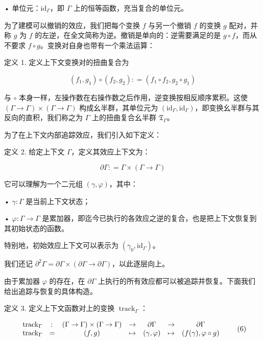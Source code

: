 \documentclass[
  10
]{article}
\begin{document}
• 单位元：\({ \mathrm { i d } } _ { \Gamma }\)，即 $\Gamma$ 上的恒等函数，充当复合的单位元。

为了建模可以撤销的效应，我们把每个变换 \(f\) 与另一个撤销 \(f\) 的变换 \(g\) 配对，并称 \(g\) 为 \(f\) 的左逆，在全文简称为逆。撤销是单向的：逆需要满足的是 \(g \circ f\)，而从不要求 \(f \circ g\)。变换对自身也带有一个乘法运算：

定义 1. 定义上下文变换对的扭曲复合为

\[
( f _ { 1 } , g _ { 1 } ) \circ ( f _ { 2 } , g _ { 2 } ) : = ( f _ { 1 } \circ f _ { 2 } , g _ { 2 } \circ g _ { 1 } )\tag{4}
\]

与 \(\circ\) 本身一样，左操作数在右操作数之后作用，逆变换按相反顺序累积。这使
\(( \Gamma \to \Gamma ) \times ( \Gamma \to \Gamma )\) 构成幺半群，其单位元为
\(( \mathrm { i d } _ { \Gamma } , \mathrm { i d } _ { \Gamma } )\)，即变换幺半群与其反向的直积，我们称之为 $\Gamma$ 上的扭曲复合幺半群 \(\mathfrak { T } _ { \Gamma }\)。

为了在上下文内部追踪效应，我们引入如下定义：

定义 2. 给定上下文 $\Gamma$，定义其效应上下文为：

\[
\partial \Gamma : = \Gamma \times ( \Gamma \to \Gamma )\tag{5}
\]

它可以理解为一个二元组 \(( \gamma , \varphi )\)，其中：

• \(\gamma : \Gamma\) 是当前上下文状态；

• \(\varphi : \Gamma \to \Gamma\) 是累加器，即迄今已执行的各效应之逆的复合，也是把上下文恢复到其初始状态的函数。

特别地，初始效应上下文可以表示为
\(( \gamma _ { 0 } , \mathrm { i d } _ { \Gamma } )\)。

我们还记
\(\partial ^ { 2 } \Gamma = \partial \Gamma \times ( \partial \Gamma \to \partial \Gamma )\)，以此逐层向上。

由于累加器 \(\varphi\) 的存在，在 \(\partial \Gamma\) 上执行的所有效应都可以被追踪并恢复。下面我们给出追踪与恢复的具体构造。

定义 3. 定义上下文函数对上的变换 \(\operatorname { t r a c k } _ { \Gamma }\)：

\[
\begin{array} { l r c l c l c }
  { \operatorname { t r a c k } _ { \Gamma } } & { \colon } & { ( \Gamma \to \Gamma ) \times ( \Gamma \to \Gamma ) } & { \to } & { \partial \Gamma } & { \to } & { \partial \Gamma } \\
  { \operatorname { t r a c k } _ { \Gamma } } & { = } & { ( f , g ) } & { \mapsto } & { ( \gamma , \varphi ) } & { \mapsto } & { ( f ( \gamma ) , \varphi \circ g ) }
\end{array}\tag{6}
\]
\end{document}

